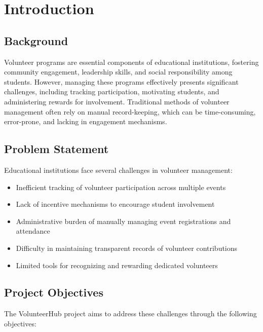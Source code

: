 \documentclass[12pt,a4paper]{report}
\begin{document}
\cleardoublepage

\chapter{Introduction}

\section{Background}
Volunteer programs are essential components of educational institutions, fostering community engagement, leadership skills, and social responsibility among students. However, managing these programs effectively presents significant challenges, including tracking participation, motivating students, and administering rewards for involvement. Traditional methods of volunteer management often rely on manual record-keeping, which can be time-consuming, error-prone, and lacking in engagement mechanisms.

\section{Problem Statement}
Educational institutions face several challenges in volunteer management:

\begin{itemize}
    \item Inefficient tracking of volunteer participation across multiple events
    \item Lack of incentive mechanisms to encourage student involvement
    \item Administrative burden of manually managing event registrations and attendance
    \item Difficulty in maintaining transparent records of volunteer contributions
    \item Limited tools for recognizing and rewarding dedicated volunteers
\end{itemize}

\section{Project Objectives}
The VolunteerHub project aims to address these challenges through the following objectives:
\end{document}
